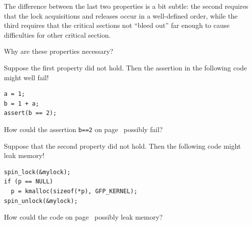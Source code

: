 The difference between the last two properties is a bit subtle:
the second requires that the lock acquisitions and releases occur
in a well-defined order, while the third requires that the critical
sections not ``bleed out'' far enough to cause difficulties for
other critical section.

Why are these properties necessary?

Suppose the first property did not hold.
Then the assertion in the following code might well fail!

\vspace{5pt}
\begin{minipage}[t]{\columnwidth}
\begin{verbatim}
a = 1;
b = 1 + a;
assert(b == 2);
\end{verbatim}
\end{minipage}
\label{codesample:advsync:What Can You Count On? 1}
\vspace{5pt}

\QuickQuiz{}
	How could the assertion {\tt b==2} on
	page~\pageref{codesample:advsync:What Can You Count On? 1}
	possibly fail?
 \QuickQuizEnd

Suppose that the second property did not hold.
Then the following code might leak memory!

\vspace{5pt}
\begin{minipage}[t]{\columnwidth}
\begin{verbatim}
spin_lock(&mylock);
if (p == NULL)
  p = kmalloc(sizeof(*p), GFP_KERNEL);
spin_unlock(&mylock);
\end{verbatim}
\end{minipage}
\label{codesample:advsync:What Can You Count On? 2}
\vspace{5pt}

\QuickQuiz{}
	How could the code on
	page~\pageref{codesample:advsync:What Can You Count On? 2}
	possibly leak memory?
 \QuickQuizEnd

